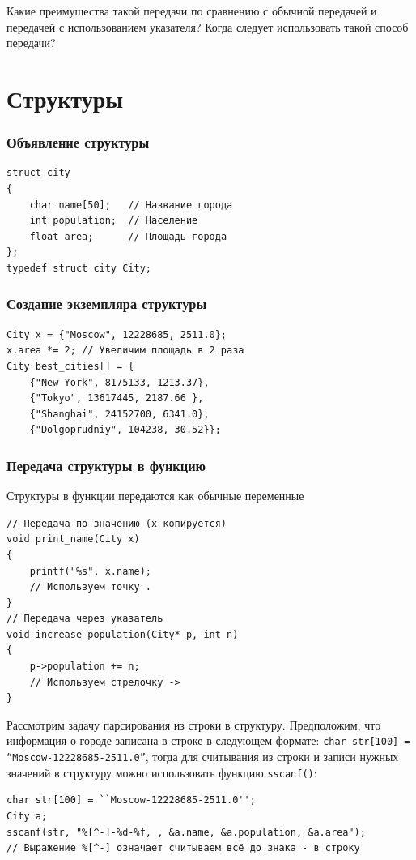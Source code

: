 \documentclass{article}
\begin{document}
\textbf{\Circpipe} Какие преимущества такой передачи по сравнению с обычной передачей и передачей с использованием указателя? Когда следует использовать такой способ передачи?
\newpage

\section*{Структуры}
\setlength{\columnsep}{1.5cm}
\setlength{\columnseprule}{0.2pt}
\begin{multicols}{2}
\subsubsection*{Объявление структуры}
\begin{lstlisting}
struct city
{
    char name[50];   // Название города
    int population;  // Население
    float area;      // Площадь города
};
typedef struct city City;   
\end{lstlisting}

\subsubsection*{Создание экземпляра структуры}
\begin{lstlisting}
City x = {"Moscow", 12228685, 2511.0};
x.area *= 2; // Увеличим площадь в 2 раза
City best_cities[] = {
    {"New York", 8175133, 1213.37},
    {"Tokyo", 13617445, 2187.66 },
    {"Shanghai", 24152700, 6341.0},
    {"Dolgoprudniy", 104238, 30.52}};
\end{lstlisting}
\subsubsection*{Передача структуры в функцию}
Структуры в функции передаются как обычные переменные
\begin{lstlisting}
// Передача по значению (x копируется)
void print_name(City x)
{
    printf("%s", x.name);
    // Используем точку .
}
// Передача через указатель
void increase_population(City* p, int n)
{
    p->population += n;
    // Используем стрелочку ->
}
\end{lstlisting}
\end{multicols}
Рассмотрим задачу парсирования из строки в структуру. Предположим, что информация о городе записана в строке в следующем формате: \texttt{char str[100] = ``Moscow-12228685-2511.0''}, тогда для считывания из строки и записи нужных значений в структуру можно использовать функцию \texttt{sscanf()}: 
\begin{lstlisting}
char str[100] = ``Moscow-12228685-2511.0'';
City a;
sscanf(str, "%[^-]-%d-%f, , &a.name, &a.population, &a.area");
// Выражение %[^-] означает считываем всё до знака - в строку
\end{lstlisting}
\end{document}

